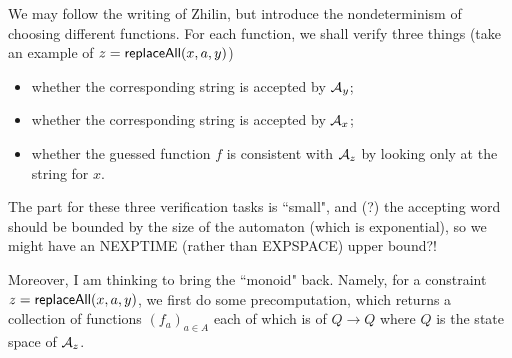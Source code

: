 \documentclass{llncs}
\begin{document}
We may follow the writing of Zhilin, but introduce the nondeterminism of choosing different functions. For each function, we shall verify three things (take an example of $z=\mathsf{replaceAll}(x, a,y)$)
\begin{itemize}
	\item whether the corresponding string is accepted by $\mathcal{A}_y$;
	\item whether the corresponding string is accepted by $\mathcal{A}_x$;
	\item whether the guessed function $f$ is consistent with $\mathcal{A}_z$ by looking only at the string for $x$. 
\end{itemize}

The part for these three verification tasks is ``small", and (?) the accepting word should be bounded by the size of the automaton (which is exponential), so we might have an NEXPTIME (rather than EXPSPACE) upper bound?!

Moreover, I am thinking to bring the ``monoid" back. Namely, for a constraint $z=\mathsf{replaceAll}(x, a,y)$, we first do some precomputation, which returns a collection of functions $(f_a)_{a\in A}$ each of which is of $Q\rightarrow Q$ where $Q$ is the state space of $\mathcal{A}_z$. 
\end{document}
